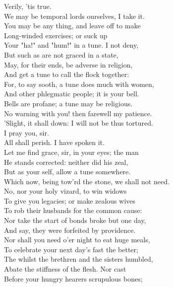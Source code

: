 \documentclass{memoir}
\begin{document}
\begin{drama*}
\tribulationspeaks {} Verily, 'tis true.\\
 We may be temporal lords ourselves, I take it.\\
\subtlespeaks  You may be any thing, and leave off to make\\
 Long-winded exercises; or suck up\\
 Your "ha!" and "hum!" in a tune. I not deny,\\
 But such as are not graced in a state,\\
 May, for their ends, be adverse in religion,\\
 And get a tune to call the flock together:\\
 For, to say sooth, a tune does much with women,\\
 And other phlegmatic people; it is your bell.\\
\ananiasspeaks  Bells are profane; a tune may be religious.\\
\subtlespeaks  No warning with you! then farewell my patience.\\
 'Slight, it shall down: I will not be thus tortured.\\
\tribulationspeaks  I pray you, sir.\\
\subtlespeaks {} All shall perish. I have spoken it.\\
\tribulationspeaks  Let me find grace, sir, in your eyes; the man\\
 He stands corrected: neither did his zeal,\\
 But as your self, allow a tune somewhere.\\
 Which now, being tow'rd the stone, we shall not need.\\
\subtlespeaks  No, nor your holy vizard, to win widows\\
 To give you legacies; or make zealous wives\\
 To rob their husbands for the common cause:\\
 Nor take the start of bonds broke but one day,\\
 And say, they were forfeited by providence.\\
 Nor shall you need o'er night to eat huge meals,\\
 To celebrate your next day's fast the better;\\
 The whilst the brethren and the sisters humbled,\\
 Abate the stiffness of the flesh. Nor cast\\
 Before your hungry hearers scrupulous bones;\\

\end{drama*}
\end{document}
